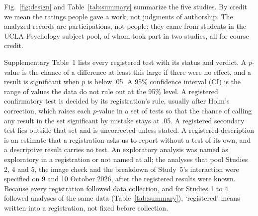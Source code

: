 
Fig.~\ref{fig:design} and Table~\ref{tab:summary} summarize the five studies. By credit we mean the ratings people gave a work, not judgments of authorship. The \NTotal{} analyzed records are participations, not people: they came from \NPeople{} students in the UCLA Psychology subject pool, \NPeopleRepeat{} of whom took part in two studies, all for course credit.

Supplementary Table~1 lists every registered test with its status and verdict. A $p$-value is the chance of a difference at least this large if there were no effect, and a result is significant when $p$ is below .05. A 95\% confidence interval (CI) is the range of values the data do not rule out at the 95\% level. A registered confirmatory test is decided by its registration's rule, usually after Holm's correction,\cite{holm1979simple} which raises each $p$-value in a set of tests so that the chance of calling any result in the set significant by mistake stays at .05. A registered secondary test lies outside that set and is uncorrected unless stated. A registered description is an estimate that a registration asks us to report without a test of its own, and a descriptive result carries no test. An exploratory analysis was named as exploratory in a registration or not named at all; the analyses that pool Studies 2, 4 and 5, the image check and the breakdown of Study~5's interaction were specified on 9 and 10 October 2026, after the registered results were known. Because every registration followed data collection, and for Studies 1 to 4 followed analyses of the same data (Table~\ref{tab:summary}), `registered' means written into a registration, not fixed before collection.

